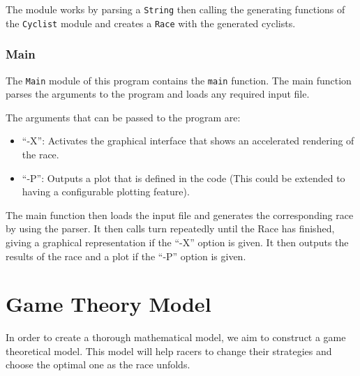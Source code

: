 \documentclass[10pt, a4paper]{report}
\begin{document}
The module works by parsing a \texttt{String} then calling the generating functions of the \texttt{Cyclist} module and creates a \texttt{Race} with the generated cyclists.

\subsubsection{Main}

The \texttt{Main} module of this program contains the \texttt{main} function.
The main function parses the arguments to the program and loads any required input file.

The arguments that can be passed to the program are:
\begin{itemize}
\item ``-X'': Activates the graphical interface that shows an accelerated rendering of the race.
\item ``-P'': Outputs a plot that is defined in the code (This could be extended to having a configurable plotting feature).
\end{itemize}

The main function then loads the input file and generates the corresponding race by using the parser. It then calls turn repeatedly until the Race has finished, giving a graphical representation if the ``-X'' option is given. It then outputs the results of the race and a plot if the ``-P'' option is given.


\section{Game Theory Model}\label{sec:gameth}

In order to create a thorough mathematical model, we aim to construct a game theoretical model. This model will help racers to change their strategies and choose the optimal one as the race unfolds.\\
\end{document}
